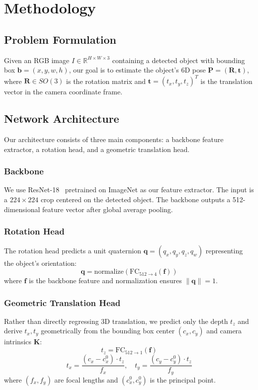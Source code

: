 \section{Methodology}
\label{sec:method}

\subsection{Problem Formulation}
Given an RGB image $I \in \mathbb{R}^{H \times W \times 3}$ containing a detected object with bounding box $\mathbf{b} = (x, y, w, h)$, our goal is to estimate the object's 6D pose $\mathbf{P} = (\mathbf{R}, \mathbf{t})$, where $\mathbf{R} \in SO(3)$ is the rotation matrix and $\mathbf{t} = (t_x, t_y, t_z)^T$ is the translation vector in the camera coordinate frame.

\subsection{Network Architecture}
Our architecture consists of three main components: a backbone feature extractor, a rotation head, and a geometric translation head.

\subsubsection{Backbone}
We use ResNet-18~\cite{he2016deep} pretrained on ImageNet as our feature extractor. The input is a $224 \times 224$ crop centered on the detected object. The backbone outputs a 512-dimensional feature vector after global average pooling.

\subsubsection{Rotation Head}
The rotation head predicts a unit quaternion $\mathbf{q} = (q_x, q_y, q_z, q_w)$ representing the object's orientation:
\begin{equation}
    \mathbf{q} = \text{normalize}(\text{FC}_{512 \rightarrow 4}(\mathbf{f}))
\end{equation}
where $\mathbf{f}$ is the backbone feature and normalization ensures $\|\mathbf{q}\| = 1$.

\subsubsection{Geometric Translation Head}
Rather than directly regressing 3D translation, we predict only the depth $t_z$ and derive $t_x, t_y$ geometrically from the bounding box center $(c_x, c_y)$ and camera intrinsics $\mathbf{K}$:
\begin{equation}
    t_z = \text{FC}_{512 \rightarrow 1}(\mathbf{f})
\end{equation}
\begin{equation}
    t_x = \frac{(c_x - c_x^0) \cdot t_z}{f_x}, \quad t_y = \frac{(c_y - c_y^0) \cdot t_z}{f_y}
\end{equation}
where $(f_x, f_y)$ are focal lengths and $(c_x^0, c_y^0)$ is the principal point.

